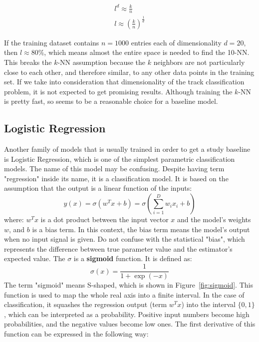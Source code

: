 \begin{align}
l^{d} \approx \frac{k}{n} \nonumber \\
l \approx (\frac{k}{n})^{\frac{1}{d}}
\end{align}

If the training dataset contains $n=1000$ entries each of dimensionality $d=20$, then $l \approx 80\%$, which means almost the entire space is needed to find the 10-NN. This breaks the $k$-NN  assumption because the $k$ neighbors are not particularly close to each other, and therefore similar, to any other data points in the training set. 
If we take into consideration that dimensionality of the track classification problem, it is not expected to get promising results. Although training the $k$-NN is pretty fast, so seems to be a reasonable choice for a baseline model. 

\subsection{Logistic Regression}
\label{sec:LogReg}
Another family of models that is usually trained in order to get a study baseline is Logistic Regression, which is one of the simplest parametric classification models. The name of this model may be confusing. Despite having term "regression" inside its name, it is a classification model. It is based on the assumption that the output is a linear function of the inputs: 
\begin{equation}
\label{eq:logreg}
    y(x) = \sigma (w^{T}x + b) = \sigma \left(\sum_{i=1}^{D}w_ix_i +b\right) 
\end{equation}
where: $w^{T}x$ is a dot product between the input vector $x$ and the model's weights $w$, and $b$ is a bias term. In this context, the bias term means the model's output when no input signal is given. Do not confuse with the statistical "bias", which represents the difference between true parameter value and the estimator's expected value. The $\sigma$ is a \textbf{sigmoid} function. It is defined as: 
\begin{equation}
\label{eg:sigmoid}
    \sigma(x) = \frac{1}{1+\exp(-x)}
\end{equation}
The term "sigmoid" means S-shaped, which is shown in Figure~\ref{fig:sigmoid}. This function is used to map the whole real axis into a finite interval. In the case of classification, it squashes the regression output (term $w^{T}x$) into the interval $\{0,1\}$, which can be interpreted as a probability. Positive input numbers become high probabilities, and the negative values become low ones. 
The first derivative of this function can be expressed in the following way:

